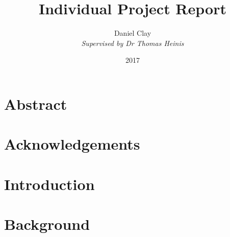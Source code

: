 \documentclass[a4paper]{article}
\begin{document}
\title{Individual Project Report}
\date{2017}
\author{
Daniel Clay \\
\emph{Supervised by Dr Thomas Heinis} 
}
\maketitle
\pagebreak

\section{Abstract}


\section{Acknowledgements}



\pagebreak
\tableofcontents
\pagebreak


\section{Introduction}


\section{Background}


\end{document}
